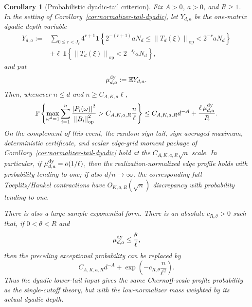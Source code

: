 \documentclass[11pt]{amsart}
\numberwithin{equation}{section}
\newtheorem{corollary}[theorem]{Corollary}
\theoremstyle{definition}
\theoremstyle{remark}
\newcommand{\op}{\mathrm{op}}
\newcommand{\Prob}{\mathbb P}
\newcommand{\Exp}{\mathbb E}
\newcommand{\norm}[1]{\left\lVert #1\right\rVert}
\newcommand{\abs}[1]{\left\lvert #1\right\rvert}
\begin{document}
\begin{corollary}[Probabilistic dyadic-tail criterion]
\label{cor:normalizer-tail-dyadic-prob}
Fix \(A>0\), \(a>0\), and \(R\ge1\).  In the setting of
Corollary~\ref{cor:normalizer-tail-dyadic}, let \(Y_{d,a}\) be the one-matrix
dyadic depth variable
\[
\begin{aligned}
  Y_{d,a}:={}&\sum_{0\le r<J_\ell}4^{r+1}
  \mathbf 1\!\left\{
  2^{-(r+1)}aN_d\le \norm{T_d(\xi)}_{\op}<2^{-r}aN_d
  \right\}  \\
  &+\ell\,
  \mathbf 1\!\left\{\norm{T_d(\xi)}_{\op}<2^{-J_\ell}aN_d\right\},
\end{aligned}
\]
and put
\[
  \mu_{d,a}^{\rm dy}:=\Exp Y_{d,a}.
\]
Then, whenever \(n\le d\) and \(n\ge C_{A,K,a}\ell\),
\[
  \Prob\left\{
  \max_{\omega^d=1}
  \sum_{i=1}^n
  \frac{\abs{P_i(\omega)}^2}{\norm{B_i}_{\op}^2}
  > C_{A,K,a,R}\frac n\ell
  \right\}
  \le
  C_{A,K,a,R}d^{-A}
  +\frac{\ell\,\mu_{d,a}^{\rm dy}}{R}.
\]
On the complement of this event, the random-sign tail, sign-averaged maximum,
deterministic certificate, and scalar edge-grid moment package of
Corollary~\ref{cor:normalizer-tail-dyadic} hold at the
\(C_{A,K,a,R}\sqrt n\) scale.  In particular, if
\(\mu_{d,a}^{\rm dy}=o(1/\ell)\), then the realization-normalized edge profile
holds with probability tending to one; if also \(d/n\to\infty\), the
corresponding full Toeplitz/Hankel contractions have \(O_{K,a,R}(\sqrt n)\)
discrepancy with probability tending to one.

There is also a large-sample exponential form.  There is an absolute
\(c_{R,\theta}>0\) such that, if \(0<\theta<R\) and
\[
  \mu_{d,a}^{\rm dy}\le \frac{\theta}{\ell},
\]
then the preceding exceptional probability can be replaced by
\[
  C_{A,K,a,R}d^{-A}
  +\exp\left(-c_{R,\theta}\frac n{\ell^2}\right).
\]
Thus the dyadic lower-tail input gives the same Chernoff-scale profile
probability as the single-cutoff theory, but with the low-normalizer mass
weighted by its actual dyadic depth.
\end{corollary}
\end{document}
